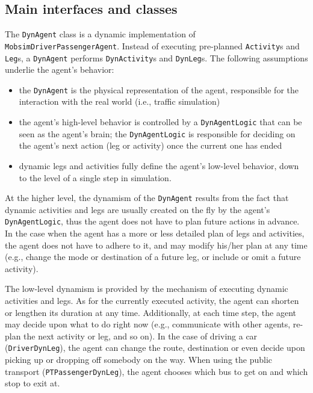 \subsection{Main interfaces and classes}

The \lstinline$DynAgent$ class is a dynamic implementation of \lstinline$MobsimDriverPassengerAgent$. Instead of executing pre-planned \lstinline$Activity$s and \lstinline$Leg$s, a \lstinline$DynAgent$ performs \lstinline$DynActivity$s and \lstinline$DynLeg$s. The following assumptions underlie the agent's behavior:
%
\begin{itemize}
	\item the \lstinline$DynAgent$ is the physical representation of the agent, responsible for the interaction with the real world (i.e., traffic simulation)

	\item the agent's high-level behavior is controlled by a \lstinline$DynAgentLogic$ that can be seen as the agent's brain; the \lstinline$DynAgentLogic$ is responsible for deciding on the agent's next action (leg or activity) once the current one has ended
	
	\item dynamic legs and activities fully define the agent's low-level behavior, down to the level of a single step in simulation.
\end{itemize}
%
At the higher level, the dynamism of the \lstinline$DynAgent$ results from the fact that dynamic activities and legs are usually created on the fly by the agent's \lstinline$DynAgentLogic$, thus the agent does not have to plan future actions in advance. In the case when the agent has a more or less detailed plan of legs and activities, the agent does not have to adhere to it, and may modify his/her plan at any time (e.g., change the mode or destination of a future leg, or include or omit a future activity).

The low-level dynamism is provided by the mechanism of executing dynamic activities and legs. As for the currently executed activity, the agent can shorten or lengthen its duration at any time. Additionally, at each time step, the agent may decide upon what to do right now (e.g., communicate with other agents, re-plan the next activity or leg, and so on). In the case of driving a car (\lstinline$DriverDynLeg$), the agent can change the route, destination or even decide upon picking up or dropping off somebody on the way. When using the public transport (\lstinline$PTPassengerDynLeg$), the agent chooses which bus to get on and which stop to exit at.

